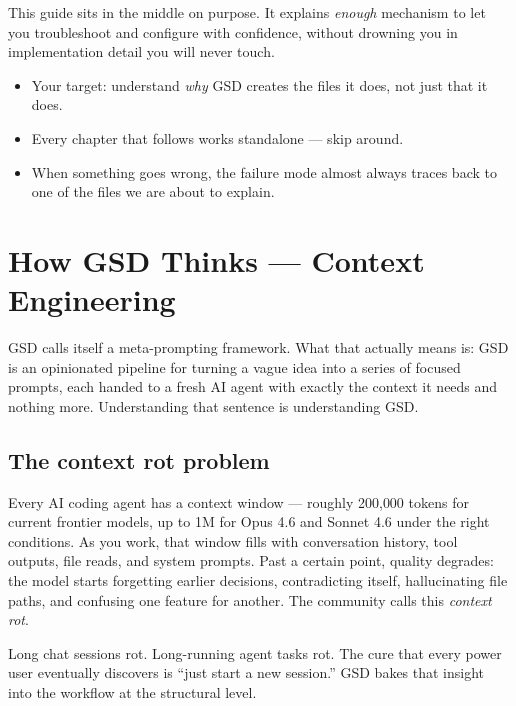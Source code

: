 \documentclass[11pt,letterpaper,openany]{book}
\begin{document}
This guide sits in the middle on purpose. It explains \emph{enough} mechanism to let you troubleshoot and configure with confidence, without drowning you in implementation detail you will never touch.

\begin{gsdnote}[title=Key Takeaways]
\begin{itemize}[itemsep=2pt,leftmargin=1.2em]
  \item Your target: understand \emph{why} GSD creates the files it does, not just that it does.
  \item Every chapter that follows works standalone --- skip around.
  \item When something goes wrong, the failure mode almost always traces back to one of the files we are about to explain.
\end{itemize}
\end{gsdnote}

\chapter{How GSD Thinks --- Context Engineering}

GSD calls itself a meta-prompting framework. What that actually means is: GSD is an opinionated pipeline for turning a vague idea into a series of focused prompts, each handed to a fresh AI agent with exactly the context it needs and nothing more. Understanding that sentence is understanding GSD.

\section{The context rot problem}

Every AI coding agent has a context window --- roughly 200{,}000 tokens for current frontier models, up to 1M for Opus 4.6 and Sonnet 4.6 under the right conditions. As you work, that window fills with conversation history, tool outputs, file reads, and system prompts. Past a certain point, quality degrades: the model starts forgetting earlier decisions, contradicting itself, hallucinating file paths, and confusing one feature for another. The community calls this \emph{context rot}.

Long chat sessions rot. Long-running agent tasks rot. The cure that every power user eventually discovers is ``just start a new session.'' GSD bakes that insight into the workflow at the structural level.
\end{document}
